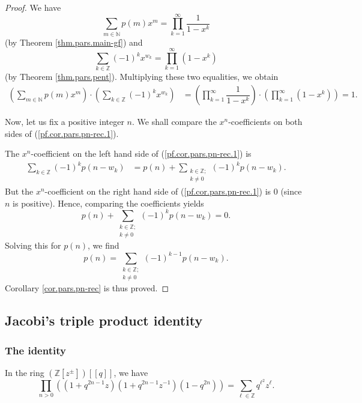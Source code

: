 \begin{proof}
We have
\[
\sum_{m\in\mathbb{N}}p\left(  m\right)  x^{m}=\prod\limits_{k=1}^{\infty}\dfrac{1}{1-x^{k}}
\]
(by Theorem \ref{thm.pars.main-gf}) and
\[
\sum_{k\in\mathbb{Z}}\left(  -1\right)  ^{k}x^{w_{k}}=\prod\limits_{k=1}
^{\infty}\left(  1-x^{k}\right)
\]
(by Theorem \ref{thm.pars.pent}). Multiplying these two equalities, we obtain
\begin{align}
\left(  \sum_{m\in\mathbb{N}}p\left(  m\right)  x^{m}\right)  \cdot\left(
\sum_{k\in\mathbb{Z}}\left(  -1\right)  ^{k}x^{w_{k}}\right)   &  =\left(
\prod\limits_{k=1}^{\infty}\dfrac{1}{1-x^{k}}\right)  \cdot\left(
\prod\limits_{k=1}^{\infty}\left(  1-x^{k}\right)  \right) =1. \label{pf.cor.pars.pn-rec.1}
\end{align}

Now, let us fix a positive integer $n$. We shall compare the $x^{n}$-coefficients on both sides of (\ref{pf.cor.pars.pn-rec.1}).

The $x^{n}$-coefficient on the left hand side of (\ref{pf.cor.pars.pn-rec.1}) is
\begin{align*}
\sum_{k\in\mathbb{Z}}\left(  -1\right)  ^{k}p\left(  n-w_{k}\right)
&  =p\left(  n\right)  +\sum_{\substack{k\in\mathbb{Z};\\k\neq0}}\left(
-1\right)  ^{k}p\left(  n-w_{k}\right)  .
\end{align*}
But the $x^{n}$-coefficient on the right hand side of (\ref{pf.cor.pars.pn-rec.1})
is $0$ (since $n$ is positive). Hence, comparing the coefficients yields
\[
p\left(  n\right)  +\sum_{\substack{k\in\mathbb{Z};\\k\neq0}}\left(
-1\right)  ^{k}p\left(  n-w_{k}\right)  =0.
\]
Solving this for $p\left(  n\right)  $, we find
\[
p\left(  n\right)  =\sum_{\substack{k\in\mathbb{Z}
;\\k\neq0}}\left(  -1\right)  ^{k-1}p\left(  n-w_{k}\right)  .
\]
Corollary \ref{cor.pars.pn-rec} is thus proved.
\end{proof}

\subsection{Jacobi's triple product identity}

\subsubsection{The identity}

\begin{theorem}
\label{thm.pars.jtp1}
\leantarget
\leanok
In the ring
$\left(  \mathbb{Z}\left[  z^{\pm}\right]  \right)  \left[  \left[  q\right]
\right]  $, we have
\[
\prod_{n>0}\left(  \left(  1+q^{2n-1}z\right)  \left(  1+q^{2n-1}
z^{-1}\right)  \left(  1-q^{2n}\right)  \right)  =\sum_{\ell\in\mathbb{Z}
}q^{\ell^{2}}z^{\ell}.
\]
\end{theorem}

